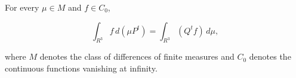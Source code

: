For every $\mu \in M$ and $f \in C_0$,

$$\int_{R^3} f\, d(\mu P^t) = \int_{R^3} (Q^t f)\, d\mu,$$

where $M$ denotes the class of differences of finite measures and $C_0$ denotes the continuous functions vanishing at infinity.
